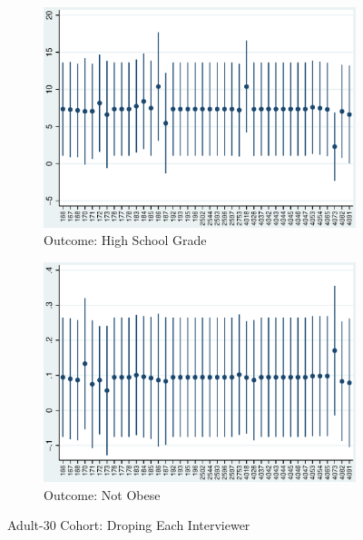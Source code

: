     \begin{figure}[H]
      \centering
        \begin{subfigure}[t]{0.75\textwidth}
          \includegraphics[width=\textwidth]{../../../output/image/coef-interviewer-adult30-votoMaturita_PmDiD.eps}       
\caption{Outcome: High School Grade}        
        \end{subfigure}
        \begin{subfigure}[t]{0.75\textwidth}
          \includegraphics[width=\textwidth]{../../../output/image/coef-interviewer-adult30-BMI_obese_PmDiD.eps}       
 \caption{Outcome: Not Obese}        
        \end{subfigure}
      \caption{Adult-30 Cohort: Droping Each Interviewer}  \label{fig:adult30-sensitivity-interviewer_PmDiD}
    \end{figure}


